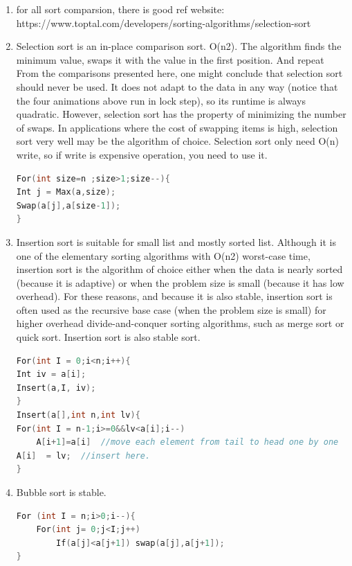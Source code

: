 \documentclass[a4paper,11pt,twoside]{book}
\begin{document}
\begin{enumerate}
	\item for all sort comparsion, there is good ref website: https://www.toptal.com/developers/sorting-algorithms/selection-sort

	\item Selection sort is an in-place comparison sort. O(n2). The algorithm finds the minimum value, swaps it with the value in the first position.  And repeat From the comparisons presented here, one might conclude that selection sort should never be used. It does not adapt to the data in any way (notice that the four animations above run in lock step), so its runtime is always quadratic. However, selection sort has the property of minimizing the number of swaps. In applications where the cost of swapping items is high, selection sort very well may be the algorithm of choice. Selection sort only need O(n) write, so if write is expensive operation, you need to use it. 
\begin{lstlisting}[frame=single, language=c++]
For(int size=n ;size>1;size--){
Int j = Max(a,size);
Swap(a[j],a[size-1]);
}
\end{lstlisting}

	\item Insertion sort is suitable for small list and mostly sorted list. Although it is one of the elementary sorting algorithms with O(n2) worst-case time, insertion sort is the algorithm of choice either when the data is nearly sorted (because it is adaptive) or when the problem size is small (because it has low overhead). For these reasons, and because it is also stable, insertion sort is often used as the recursive base case (when the problem size is small) for higher overhead divide-and-conquer sorting algorithms, such as merge sort or quick sort. Insertion sort is also stable sort. 

\begin{lstlisting}[frame=single, language=c++]
For(int I = 0;i<n;i++){
Int iv = a[i];
Insert(a,I, iv);
}
Insert(a[],int n,int lv){
For(int I = n-1;i>=0&&lv<a[i];i--)
    A[i+1]=a[i]  //move each element from tail to head one by one
A[i]  = lv;  //insert here. 
}
\end{lstlisting}

	\item Bubble sort is stable.
\begin{lstlisting}[frame=single, language=c++]
For (int I = n;i>0;i--){
	For(int j= 0;j<I;j++)
		If(a[j]<a[j+1]) swap(a[j],a[j+1]);
}
\end{lstlisting}


\end{enumerate}
\end{document}
